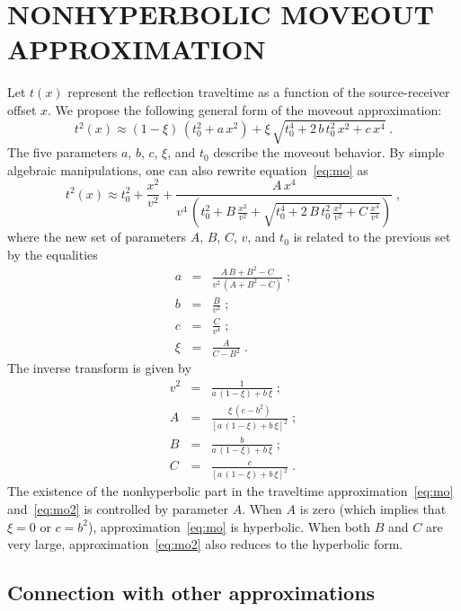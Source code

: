 \section{NONHYPERBOLIC MOVEOUT APPROXIMATION}

Let $t(x)$ represent the reflection traveltime as a function of the
source-receiver offset $x$. We propose the following general form of
the moveout approximation:
\begin{equation}
\label{eq:mo}
t^2(x) \approx (1-\xi)\,(t_0^2+a\,x^2) + \xi\,\sqrt{t_0^4 + 2\,b\,t_0^2\,x^2 + c\,x^4}\;.
\end{equation}
The five parameters $a$, $b$, $c$, $\xi$, and $t_0$
describe the moveout behavior. By simple algebraic manipulations, one
can also rewrite equation~\ref{eq:mo} as
\begin{equation}
\label{eq:mo2}
t^2(x) \approx t_0^2+\frac{x^2}{v^2} + \frac{A\,x^4}
{\displaystyle v^4\,\left(t_0^2+B\,\frac{x^2}{v^2} + \sqrt{t_0^4 + 2\,B\,t_0^2\,\frac{x^2}{v^2} + C\,\frac{x^4}{v^4}}\right)}\;,
\end{equation}
where the new set of parameters $A$, $B$, $C$, $v$, and $t_0$ is
related to the previous set by the equalities
\begin{eqnarray}
\label{eq;alpha}
a & = & \frac{A\,B+B^2-C}{v^2\,\left(A+B^2-C\right)}\;; \\
\label{eq:beta}
b & = & \frac{B}{v^2}\;; \\
\label{eq:gamma}
c & = & \frac{C}{v^4}\;; \\
\label{eq:xi}
\xi & = & \frac{A}{C-B^2}\;.
\end{eqnarray}
The inverse transform is given by
\begin{eqnarray}
\label{eq:v}
v^2 & = & \frac{1}{a\,(1-\xi) + b\,\xi}\;; \\
\label{eq:a}
A & = & \frac{\xi\,\left(c - b^2\right)}
{\left[a\,(1-\xi) + b\,\xi\right]^2}\;; \\
\label{eq:b}
B & = & \frac{b}{a\,(1-\xi) + b\,\xi}\;; \\
\label{eq:c}
C & = & \frac{c}{\left[a\,(1-\xi) + b\,\xi\right]^2}\;.
\end{eqnarray}
The existence of the nonhyperbolic part in the traveltime
approximation~\ref{eq:mo} and~\ref{eq:mo2} is controlled by parameter
$A$. When $A$ is zero (which implies that $\xi=0$ or $c=b^2$),
approximation~\ref{eq:mo} is hyperbolic. When both $B$ and $C$ are
very large, approximation~\ref{eq:mo2} also reduces to the hyperbolic
form.

\subsection{Connection with other approximations}


